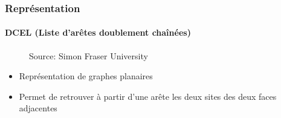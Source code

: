 \begin{frame}
\frametitle{Représentation}
\framesubtitle{DCEL (Liste d'arêtes doublement chaînées)}

\begin{figure}
    \centering
    \def\stackalignment{r}
           {\sources
        Source: Simon Fraser University}
\end{figure}
\begin{itemize}
    \item Représentation de graphes planaires
    \item Permet de retrouver à partir d'une arête les deux sites des deux faces adjacentes
\end{itemize}
    
\end{frame}

